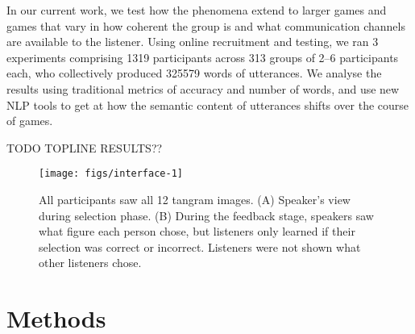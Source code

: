 \documentclass[
  english,
  a4paper,
]{article}
\begin{document}
In our current work, we test how the phenomena extend to larger games and games that vary in how coherent the group is and what communication channels are available to the listener. Using online recruitment and testing, we ran 3 experiments comprising 1319 participants across 313 groups of 2--6 participants each, who collectively produced 325579 words of utterances. We analyse the results using traditional metrics of accuracy and number of words, and use new NLP tools to get at how the semantic content of utterances shifts over the course of games.

TODO TOPLINE RESULTS??

\begin{figure*}[t!]

{\centering \texttt{[image: figs/interface-1]} 

}

\caption{All participants saw all 12 tangram images. (A) Speaker's view during selection phase. (B) During the feedback stage, speakers saw what figure each person chose, but listeners only learned if their selection was correct or incorrect. Listeners were not shown what other listeners chose. \label{game}}\label{fig:interface}
\end{figure*}

\hypertarget{methods}{%
\section{Methods}\label{methods}}

        
        
    
    

\end{document}
